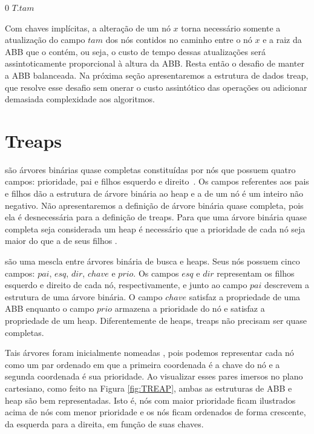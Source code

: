 \begin{algorithm}[!htb]
\caption{\treapGetSize($T$)}
\label{Algo:treapGetSize}
\begin{algorithmic}[1]
\State \Return $0$
\EndIf
\State \Return $T$.$tam$
\end{algorithmic}
\end{algorithm}

Com chaves implícitas, a alteração de um nó $x$ torna necessário somente a atualização do campo $tam$ dos nós contidos no caminho entre o nó $x$ e a raiz da ABB que o contém, ou seja, o custo de tempo dessas atualizações será assintoticamente proporcional à altura da ABB. Resta então o desafio de manter a ABB balanceada. Na próxima seção apresentaremos a estrutura de dados treap, que resolve esse desafio sem onerar o custo assintótico das operações ou adicionar demasiada complexidade aos algoritmos.

\section{Treaps}

 são árvores binárias quase completas constituídas por nós que possuem quatro campos: prioridade, pai e filhos esquerdo e direito~\cite{CLRS}. Os campos referentes aos pais e filhos dão a estrutura de árvore binária ao heap e a  de um nó é um inteiro não negativo. Não apresentaremos a definição de árvore binária quase completa, pois ela é desnecessária para a definição de treaps. Para que uma árvore binária quase completa seja considerada um heap é necessário que a prioridade de cada nó seja maior do que a de seus filhos .

 são uma mescla entre árvores binária de busca e heaps. Seus nós possuem cinco campos: $pai$, $esq$, $dir$, $chave$ e $prio$. Os campos $esq$ e $dir$ representam os filhos esquerdo e direito de cada nó, respectivamente, e junto ao campo $pai$ descrevem a estrutura de uma árvore binária. O campo $chave$ satisfaz a propriedade de uma ABB enquanto o campo $prio$ armazena a prioridade do nó e satisfaz a propriedade de um heap. Diferentemente de heaps, treaps não precisam ser quase completas.


Tais árvores foram inicialmente nomeadas  \cite{Vuillemin1980AUL}, pois podemos representar cada nó como um par ordenado em que a primeira coordenada é a chave do nó e a segunda coordenada é sua prioridade. Ao visualizar esses pares imersos no plano cartesiano, como feito na Figura \ref{fig:TREAP}, ambas as estruturas de ABB e heap são bem representadas. Isto é, nós com maior prioridade ficam ilustrados acima de nós com menor prioridade e os nós ficam ordenados de forma crescente, da esquerda para a direita, em função de suas chaves.

